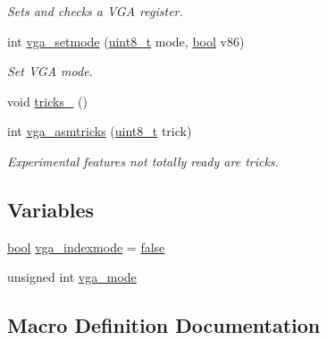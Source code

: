 \begin{DoxyCompactItemize}
\begin{DoxyCompactList}\small\item\em Sets and checks a V\+GA register. \end{DoxyCompactList}\item 
int \hyperlink{a00008_a8eec470a23e284551ba78ac240777939_a8eec470a23e284551ba78ac240777939}{vga\+\_\+setmode} (\hyperlink{a00038_aba7bc1797add20fe3efdf37ced1182c5_aba7bc1797add20fe3efdf37ced1182c5}{uint8\+\_\+t} mode, \hyperlink{a00038_af6a258d8f3ee5206d682d799316314b1_af6a258d8f3ee5206d682d799316314b1}{bool} v86)
\begin{DoxyCompactList}\small\item\em Set V\+GA mode. \end{DoxyCompactList}\item 
void \hyperlink{a00008_ada7cac23e36d1c5dbac6cbce14819f13_ada7cac23e36d1c5dbac6cbce14819f13}{tricks\+\_} ()
\item 
int \hyperlink{a00008_ab02c5c9bbc1e5c29dbb8898aee387eb2_ab02c5c9bbc1e5c29dbb8898aee387eb2}{vga\+\_\+asmtricks} (\hyperlink{a00038_aba7bc1797add20fe3efdf37ced1182c5_aba7bc1797add20fe3efdf37ced1182c5}{uint8\+\_\+t} trick)
\begin{DoxyCompactList}\small\item\em Experimental features not totally ready are tricks. \end{DoxyCompactList}\end{DoxyCompactItemize}
\subsection*{Variables}
\begin{DoxyCompactItemize}
\item 
\hyperlink{a00038_af6a258d8f3ee5206d682d799316314b1_af6a258d8f3ee5206d682d799316314b1}{bool} \hyperlink{a00008_ac3b46aeb1d097fe149a3e8f98653c872_ac3b46aeb1d097fe149a3e8f98653c872}{vga\+\_\+indexmode} = \hyperlink{a00038_af6a258d8f3ee5206d682d799316314b1_af6a258d8f3ee5206d682d799316314b1ae9de385ef6fe9bf3360d1038396b884c}{false}
\item 
unsigned int \hyperlink{a00008_ab1902955c9a6467e453b0e28f3c2d247_ab1902955c9a6467e453b0e28f3c2d247}{vga\+\_\+mode}
\end{DoxyCompactItemize}


\subsection{Macro Definition Documentation}
\mbox{\label{a00008_a34fb560ebb3467ef63fc70ae48a3cfbc_a34fb560ebb3467ef63fc70ae48a3cfbc}} 
